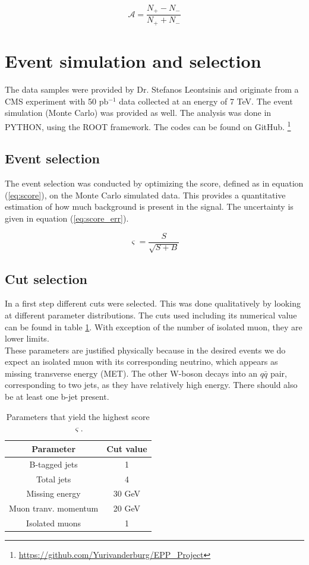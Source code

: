 \documentclass[%
 reprint,
 amsmath,amssymb,
 aps,
]{revtex4-2}
\begin{document}
\begin{equation}\label{eq:charge_asym}
    \mathcal{A} = \frac{N_+ - N_-}{N_+ + N_-}
\end{equation}


\section{\label{sec:}Event simulation and selection}
The data samples were provided by Dr. Stefanos Leontsinis and originate from a CMS experiment with 50 pb$^{-1}$ data collected at an energy of 7 TeV. The event simulation (Monte Carlo) was provided as well. 
The analysis was done in \textsc{PYTHON}, using the \textsc{ROOT} framework. The codes can be found on GitHub. \footnote{\url{https://github.com/Yurivanderburg/EPP_Project}} 


\subsection{\label{sec:}Event selection}
The event selection was conducted by optimizing the score, defined as in equation (\ref{eq:score}), on the Monte Carlo simulated data. This provides a quantitative estimation of how much background is present in the signal. The uncertainty is given in equation (\ref{eq:score_err}).

\begin{equation}\label{eq:score}
    \varsigma = \frac{S}{\sqrt{S + B}}
\end{equation}


\subsection{Cut selection}
In a first step different cuts were selected. This was done qualitatively by looking at different parameter distributions. The cuts used including its numerical value can be found in table \ref{tab:optimal_params}. With exception of the number of isolated muon, they are lower limits. \\
These parameters are justified physically because in the desired events we do expect an isolated muon with its corresponding neutrino, which appears as missing transverse energy (MET). The other W-boson decays into an $q \bar q$ pair, corresponding to two jets, as they have relatively high energy. There should also be at least one b-jet present.  

\begin{table}[b]
    \centering
    \begin{tabular}{|c|c|}
    \hline
    Parameter            & Cut value \\
    \hline
    B-tagged jets        &  1 \\
    Total jets           &  4 \\
    Missing energy       &  30 GeV \\
    Muon tranv. momentum &  20 GeV \\
    Isolated muons       &  1 \\
    \hline
    \end{tabular}
    \caption{Parameters that yield the highest score $\varsigma$. }
    \label{tab:optimal_params}
\end{table}
\end{document}
